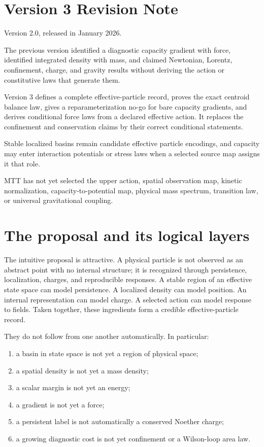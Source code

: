 \documentclass[11pt]{article}
\begin{document}
\section*{Version 3 Revision Note}
\begin{description}[leftmargin=2.8cm,style=nextline]
\item[Supersedes] Version 2.0, released in January 2026.
\item[Reason] The previous version identified a diagnostic capacity gradient
with force, identified integrated density with mass, and claimed Newtonian,
Lorentz, confinement, charge, and gravity results without deriving the action
or constitutive laws that generate them.
\item[Resolution] Version 3 defines a complete effective-particle record,
proves the exact centroid balance law, gives a reparameterization no-go for
bare capacity gradients, and derives conditional force laws from a declared
effective action.  It replaces the confinement and conservation claims by
their correct conditional statements.
\item[Retained content] Stable localized basins remain candidate effective
particle encodings, and capacity may enter interaction potentials or stress
laws when a selected source map assigns it that role.
\item[Open boundary] MTT has not yet selected the upper action, spatial
observation map, kinetic normalization, capacity-to-potential map, physical
mass spectrum, transition law, or universal gravitational coupling.
\end{description}

\tableofcontents

\section{The proposal and its logical layers}

The intuitive proposal is attractive.  A physical particle is not observed as
an abstract point with no internal structure; it is recognized through
persistence, localization, charges, and reproducible responses.  A stable
region of an effective state space can model persistence.  A localized density
can model position.  An internal representation can model charge.  A selected
action can model response to fields.  Taken together, these ingredients form a
credible effective-particle record.

They do not follow from one another automatically.  In particular:
\begin{enumerate}
\item a basin in state space is not yet a region of physical space;
\item a spatial density is not yet a mass density;
\item a scalar margin is not yet an energy;
\item a gradient is not yet a force;
\item a persistent label is not automatically a conserved Noether charge;
\item a growing diagnostic cost is not yet confinement or a Wilson-loop area
law.
\end{enumerate}
\end{document}
